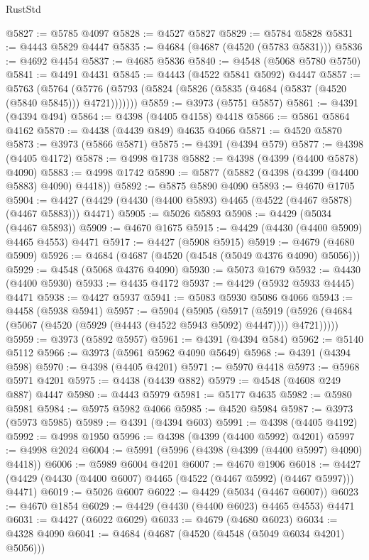 \begin{lexlean}{RustStd}
\begin{coremodule}
@5827 := @5785 @4097
@5828 := @4527 @5827
@5829 := @5784 @5828
@5831 := @4443 @5829 @4447
@5835 := @4684 (@4687 (@4520 (@5783 @5831)))
@5836 := @4692 @4454
@5837 := @4685 @5836
@5840 := @4548 (@5068 @5780 @5750)
@5841 := @4491 @4431
@5845 := @4443 (@4522 @5841 @5092) @4447
@5857 := @5763
    (@5764 (@5776 (@5793 (@5824 (@5826 (@5835 (@4684 (@5837 (@4520 (@5840 @5845))) @4721)))))))
@5859 := @3973 (@5751 @5857)
@5861 := @4391 (@4394 @494)
@5864 := @4398 (@4405 @4158) @4418
@5866 := @5861 @5864 @4162
@5870 := @4438 (@4439 @849) @4635 @4066
@5871 := @4520 @5870
@5873 := @3973 (@5866 @5871)
@5875 := @4391 (@4394 @579)
@5877 := @4398 (@4405 @4172)
@5878 := @4998 @1738
@5882 := @4398 (@4399 (@4400 @5878) @4090)
@5883 := @4998 @1742
@5890 := @5877 (@5882 (@4398 (@4399 (@4400 @5883) @4090) @4418))
@5892 := @5875 @5890 @4090
@5893 := @4670 @1705
@5904 := @4427 (@4429 (@4430 (@4400 @5893) @4465 (@4522 (@4467 @5878) (@4467 @5883))) @4471)
@5905 := @5026 @5893
@5908 := @4429 (@5034 (@4467 @5893))
@5909 := @4670 @1675
@5915 := @4429 (@4430 (@4400 @5909) @4465 @4553) @4471
@5917 := @4427 (@5908 @5915)
@5919 := @4679 (@4680 @5909)
@5926 := @4684 (@4687 (@4520 (@4548 (@5049 @4376 @4090) @5056)))
@5929 := @4548 (@5068 @4376 @4090)
@5930 := @5073 @1679
@5932 := @4430 (@4400 @5930)
@5933 := @4435 @4172
@5937 := @4429 (@5932 @5933 @4445) @4471
@5938 := @4427 @5937
@5941 := @5083 @5930 @5086 @4066
@5943 := @4458 (@5938 @5941)
@5957 := @5904
    (@5905
      (@5917
        (@5919 (@5926 (@4684 (@5067 (@4520 (@5929 (@4443 (@4522 @5943 @5092) @4447)))) @4721)))))
@5959 := @3973 (@5892 @5957)
@5961 := @4391 (@4394 @584)
@5962 := @5140 @5112
@5966 := @3973 (@5961 @5962 @4090 @5649)
@5968 := @4391 (@4394 @598)
@5970 := @4398 (@4405 @4201)
@5971 := @5970 @4418
@5973 := @5968 @5971 @4201
@5975 := @4438 (@4439 @882)
@5979 := @4548 (@4608 @249 @887) @4447
@5980 := @4443 @5979
@5981 := @5177 @4635
@5982 := @5980 @5981
@5984 := @5975 @5982 @4066
@5985 := @4520 @5984
@5987 := @3973 (@5973 @5985)
@5989 := @4391 (@4394 @603)
@5991 := @4398 (@4405 @4192)
@5992 := @4998 @1950
@5996 := @4398 (@4399 (@4400 @5992) @4201)
@5997 := @4998 @2024
@6004 := @5991 (@5996 (@4398 (@4399 (@4400 @5997) @4090) @4418))
@6006 := @5989 @6004 @4201
@6007 := @4670 @1906
@6018 := @4427 (@4429 (@4430 (@4400 @6007) @4465 (@4522 (@4467 @5992) (@4467 @5997))) @4471)
@6019 := @5026 @6007
@6022 := @4429 (@5034 (@4467 @6007))
@6023 := @4670 @1854
@6029 := @4429 (@4430 (@4400 @6023) @4465 @4553) @4471
@6031 := @4427 (@6022 @6029)
@6033 := @4679 (@4680 @6023)
@6034 := @4328 @4090
@6041 := @4684 (@4687 (@4520 (@4548 (@5049 @6034 @4201) @5056)))

\end{coremodule}
\end{lexlean}
